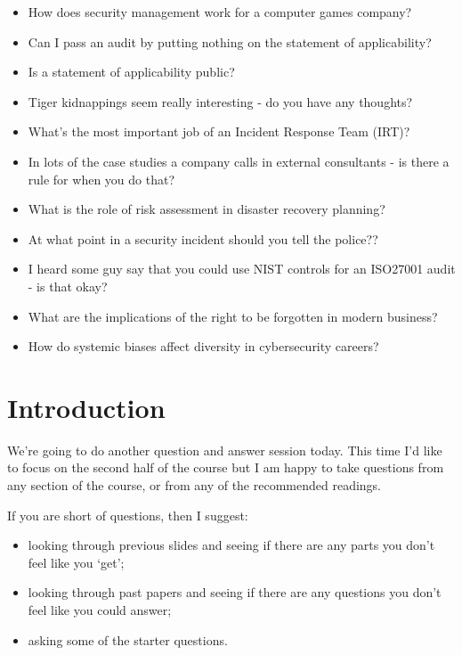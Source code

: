 \documentclass[12pt]{article}
\begin{document}
\begin{itemize}
  \item How does security management work for a computer games company?
  \item Can I pass an audit by putting nothing on the statement of applicability?
  \item Is a statement of applicability public?
  \item Tiger kidnappings seem really interesting - do you have any thoughts?
  \item What's the most important job of an Incident Response Team (IRT)?
  \item In lots of the case studies a company calls in external consultants - is there a rule for when you do that?
  \item What is the role of risk assessment in disaster recovery planning?
  \item At what point in a security incident should you tell the police??
  \item I heard some guy say that you could use NIST controls for an ISO27001 audit - is that okay?
  \item What are the implications of the right to be forgotten in modern business?
  \item How do systemic biases affect diversity in cybersecurity careers?
\end{itemize}


%
%



\maketitle

\section*{Introduction}
We're going to do another question and answer session today. This time I'd like to focus on the second half of the course but I am happy to take questions from any section of the course, or from any of the recommended readings. 

If you are short of questions, then I suggest: 

\begin{itemize} 
\item looking through previous slides and seeing if there are any parts you don't feel like you `get';
\item looking through past papers and seeing if there are any questions you don't feel like you could answer;
\item asking some of the starter questions.
\end{itemize} 
\end{document}
